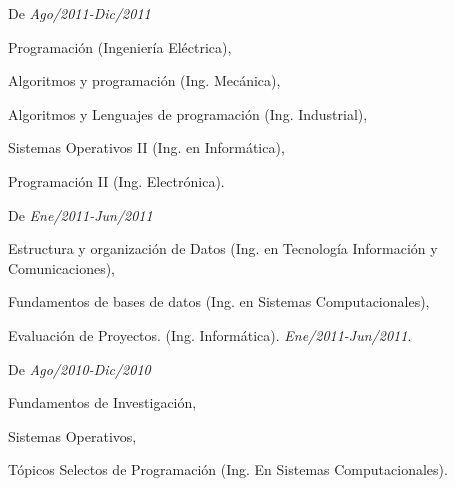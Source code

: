 \documentclass[10pt]{article}
\newenvironment{innerlist}[1][\enskip\textbullet]%
        {\begin{compactitem}[#1]}{\end{compactitem}}
\begin{document}
\begin{innerlist}
\item[De  \textit{Ago/2011-Dic/2011}  ]
\item Programación (Ingeniería Eléctrica), 
\item Algoritmos y programación (Ing. Mecánica), 
\item Algoritmos y Lenguajes de programación (Ing. Industrial), 
\item Sistemas Operativos II (Ing. en Informática), 
\item Programación II (Ing. Electrónica). 
\item[]
\item[ De \textit{Ene/2011-Jun/2011}]

\item Estructura y organización de Datos (Ing. en Tecnología Información y Comunicaciones), 
\item Fundamentos de bases de datos (Ing. en Sistemas Computacionales), 
\item Evaluación de Proyectos. (Ing. Informática). \textit{Ene/2011-Jun/2011}.
\item[]
\item[ De \textit{Ago/2010-Dic/2010}]

\item Fundamentos de Investigación, 
\item Sistemas Operativos, 
\item Tópicos Selectos de Programación (Ing. En Sistemas Computacionales).  

\end{innerlist}
\end{document}
